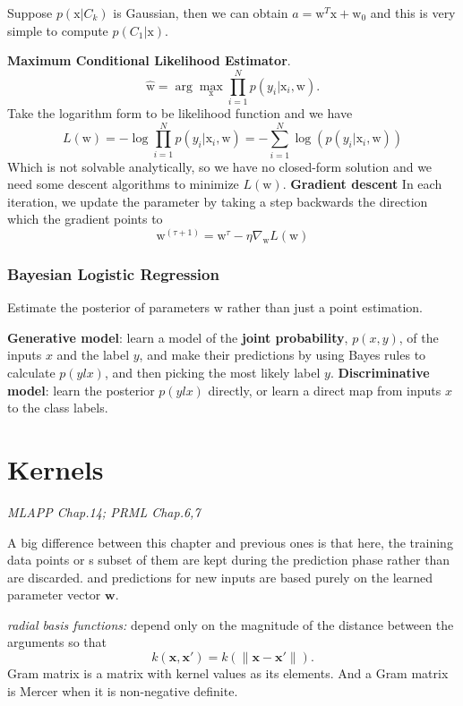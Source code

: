 \documentclass{article}
\newcommand{\mrm}{\mathrm}
\newcommand{\mbf}{\mathbf}
\newcommand{\ww}{\mbf w}
\newcommand{\xx}{\mbf x}
\begin{document}
Suppose $p(\mrm x|C_k)$ is  Gaussian, then we can obtain $a = \mrm w^T\mrm x+\mrm w_0$ and this is very simple to compute $p(C_1|\mrm x)$.

\textbf{Maximum Conditional Likelihood Estimator}.\newline
\begin{equation}
    \hat{\mrm w} = \arg\max_{\mrm x}\prod_{i=1}^{N}p(y_i|\mrm x_i,\mrm w).
\end{equation}
Take the logarithm form to be likelihood function and we have 
\begin{equation}
    L(\mrm w) = -\log\prod_{i=1}^{N}p(y_i|\mrm x_i,\mrm w)=-\sum_{i=1}^{N}\log(p(y_i|\mrm x_i,\mrm w))
\end{equation}
Which is not solvable analytically, so we have no closed-form solution and we need some descent algorithms to minimize $L(\mrm w)$.
\textbf{Gradient descent}
In each iteration, we update the parameter by taking a step backwards the direction which the gradient points to
\begin{equation}
    \mrm w^{(\tau+1)} = \mrm w^{\tau}-\eta \nabla_{\mrm w}L(\mrm w)
\end{equation}

\subsubsection*{Bayesian Logistic Regression}
Estimate the posterior of parameters $\mrm w$ rather than just a point estimation.

\textbf{Generative model}: learn a model of the \textbf{joint probability}, $p(x, y)$, of the inputs $x$ and the label $y$, and make their predictions by using Bayes rules to calculate $p(ylx)$, and then picking the most likely label $y$.\newline
\textbf{Discriminative model}: learn the posterior $p(ylx)$ directly, or learn a direct map from inputs $x$ to the class labels.

\section{Kernels}
\emph{MLAPP Chap.14; PRML Chap.6,7}

A big difference between this chapter and previous ones is that here, the training data points or s subset of them are kept during the prediction phase rather than are discarded.  and predictions for new inputs are based purely on the learned parameter vector $\ww$.

\emph{radial basis functions:} depend only on the magnitude of the distance between the arguments so that 
\begin{equation}
    k(\xx,\xx')=k(\|\xx-\xx'\|).
\end{equation}
Gram matrix is a matrix with kernel values as its elements. And a Gram matrix is Mercer when it is non-negative definite. 
\end{document}
